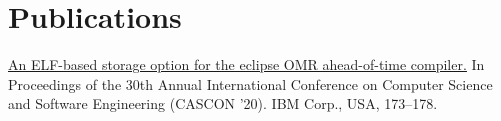 \documentclass[letterpaper,10pt]{article}
\begin{document}
%
\section{Publications}
 \begin{itemize}[leftmargin=0.15in, label={}]
    \small{\item{
      \href{https://dl.acm.org/doi/abs/10.5555/3432601.3432624}{\underline{{An ELF-based storage option for the eclipse OMR ahead-of-time compiler.}}}{ In Proceedings of the 30th Annual International Conference on Computer Science and Software Engineering (CASCON '20). IBM Corp., USA, 173–178.} 
     }}
 \end{itemize}


\end{document}
